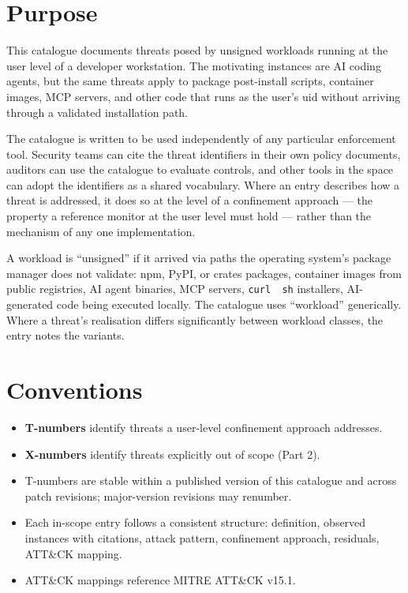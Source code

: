 \hypertarget{purpose}{%
\chapter{Purpose}\label{purpose}}

This catalogue documents threats posed by unsigned workloads running at
the user level of a developer workstation. The motivating instances are
AI coding agents, but the same threats apply to package post-install
scripts, container images, MCP servers, and other code that runs as the
user's uid without arriving through a validated installation path.

The catalogue is written to be used independently of any particular
enforcement tool. Security teams can cite the threat identifiers in
their own policy documents, auditors can use the catalogue to evaluate
controls, and other tools in the space can adopt the identifiers as a
shared vocabulary. Where an entry describes how a threat is addressed,
it does so at the level of a confinement approach --- the property a
reference monitor at the user level must hold --- rather than the
mechanism of any one implementation.

A workload is ``unsigned'' if it arrived via paths the operating
system's package manager does not validate: npm, PyPI, or crates
packages, container images from public registries, AI agent binaries,
MCP servers, \texttt{curl\ \textbar{}\ sh} installers, AI-generated code
being executed locally. The catalogue uses ``workload'' generically.
Where a threat's realisation differs significantly between workload
classes, the entry notes the variants.

\hypertarget{conventions}{%
\chapter{Conventions}\label{conventions}}

\begin{itemize}
\tightlist
\item
  \textbf{T-numbers} identify threats a user-level confinement approach
  addresses.
\item
  \textbf{X-numbers} identify threats explicitly out of scope (Part 2).
\item
  T-numbers are stable within a published version of this catalogue and
  across patch revisions; major-version revisions may renumber.
\item
  Each in-scope entry follows a consistent structure: definition,
  observed instances with citations, attack pattern, confinement
  approach, residuals, ATT\&CK mapping.
\item
  ATT\&CK mappings reference MITRE ATT\&CK v15.1.
\end{itemize}

